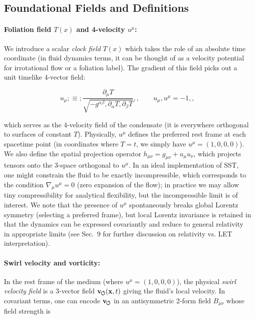 \documentclass[10pt,reprint,aps,onecolumn,nofootinbib]{revtex4-2}
\newcommand{\swirlarrow}{%
    \mathchoice{\mkern-2mu\scriptstyle\boldsymbol{\circlearrowleft}}%
    {\mkern-2mu\scriptstyle\boldsymbol{\circlearrowleft}}%
    {\mkern-2mu\scriptstyle\boldsymbol{\circlearrowleft}}%
    {\mkern-2mu\scriptscriptstyle\boldsymbol{\circlearrowleft}}%
}
\newcommand{\vswirl}{\mathbf{v}_{\swirlarrow}}
\begin{document}
\subsection{Foundational Fields and Definitions}

\label{sec:fields}

\paragraph{Foliation field $T(x)$ and 4-velocity $u^\mu$:} We introduce a scalar \emph{clock field} $T(x)$ which takes the role of an absolute time coordinate (in fluid dynamics terms, it can be thought of as a velocity potential for irrotational flow or a foliation label). The gradient of this field picks out a unit timelike 4-vector field:

\begin{equation}

u_\mu ;\equiv; \frac{\partial_\mu T}{\sqrt{-g^{\alpha\beta},\partial_\alpha T,\partial_\beta T}},, \qquad

u_\mu,u^\mu = -1,,

\label{eq:timelike}

\end{equation}

which serves as the 4-velocity field of the condensate (it is everywhere orthogonal to surfaces of constant $T$). Physically, $u^\mu$ defines the preferred rest frame at each spacetime point (in coordinates where $T = t$, we simply have $u^\mu=(1,0,0,0)$). We also define the spatial projection operator $h_{\mu\nu} = g_{\mu\nu} + u_{\mu}u_{\nu}$, which projects tensors onto the 3-space orthogonal to $u^\mu$. In an ideal implementation of SST, one might constrain the fluid to be exactly incompressible, which corresponds to the condition $\nabla_\mu u^\mu = 0$ (zero expansion of the flow); in practice we may allow tiny compressibility for analytical flexibility, but the incompressible limit is of interest. We note that the presence of $u^\mu$ spontaneously breaks global Lorentz symmetry (selecting a preferred frame), but local Lorentz invariance is retained in that the dynamics can be expressed covariantly and reduce to general relativity in appropriate limits (see Sec.~9 for further discussion on relativity vs. LET interpretation).


\paragraph{Swirl velocity and vorticity:} In the rest frame of the medium (where $u^\mu=(1,0,0,0)$), the physical \emph{swirl velocity field} is a 3-vector field $\vswirl(\mathbf{x},t)$ giving the fluid’s local velocity. In covariant terms, one can encode $\vswirl$ in an antisymmetric 2-form field $B_{\mu\nu}$ whose field strength is
\end{document}
